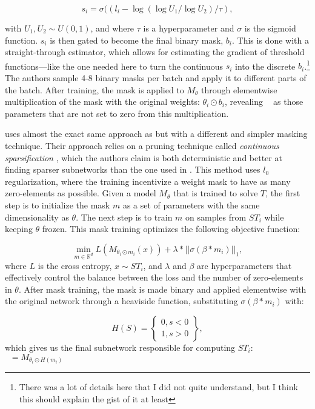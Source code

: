 \documentclass[11pt]{article}
\DeclareMathOperator*{\mini}{min}
\DeclareMathOperator*{\subnetwork}{\hat{\theta_i}}
\begin{document}
\begin{equation}
s_i = \sigma((l_i - \log(\log U_1 / \log U_2) / \tau),
\end{equation}

with $U_1, U_2 \sim U(0,1)$, and where $\tau$ is a hyperparameter and $\sigma$ is the sigmoid function. $s_i$ is then gated to become the final binary mask, $b_i$. This is done with a straight-through estimator, which allows for estimating the gradient of threshold functions---like the one needed here to turn the continuous $s_i$ into the discrete $b_i$.\footnote{There was a lot of details here that I did not quite understand, but I think this should explain the gist of it at least} The authors sample 4-8 binary masks per batch and apply it to different parts of the batch. After training, the mask is applied to $M_\theta$ through elementwise multiplication of the mask with the original weights: $\theta_i \odot b_i$, revealing $\subnetwork$ as those parameters that are not set to zero from this multiplication.

\citet{lepori2023break} uses almost the exact same approach as \citet{csordas2020neural} but with a different and simpler masking technique. Their approach relies on a pruning technique called \textit{continuous sparsification} \citep{savarese2020winning}, which the authors claim is both deterministic and better at finding sparser subnetworks than the one used in \citet{csordas2020neural}. This method uses $l_0$ regularization, where the training incentivize a weight mask to have as many zero-elements as possible. Given a model $M_\theta$ that is trained to solve $T$, the first step is to initialize the mask $m$ as a set of parameters with the same dimensionality as $\theta$. The next step is to train $m$ on samples from $ST_i$ while keeping $\theta$ frozen. This mask training optimizes the following objective function: 

\begin{equation}
\mini_{m \in \mathbb{R}^d} L (M_{\theta_i \odot m_i}(x)) + \lambda * ||\sigma(\beta * m_i)||_1,
\end{equation}
where $L$ is the cross entropy, $x \sim ST_i$, and $\lambda$ and $\beta$ are hyperparameters that effectively control the balance between the loss and the number of zero-elements in $\theta$. After mask training, the mask is made binary and applied elementwise with the original network through a heaviside function, substituting $\sigma(\beta * m_i)$ with:

\begin{equation}
    H(S)=
    \left\{
    \begin{array}{lr}
      0,  s < 0 \\
      1,  s > 0
    \end{array}
    \right\},
\end{equation}
which gives us the final subnetwork responsible for computing $ST_i$: $\subnetwork = M_{\theta_i \odot H(m_i)}$
\end{document}

